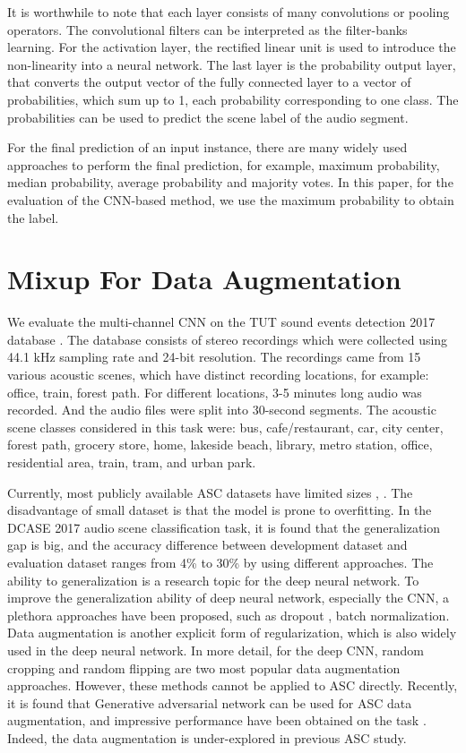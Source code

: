 \documentclass[conference]{IEEEtran}
\begin{document}
It is worthwhile to note that each layer consists of many convolutions or pooling operators. The convolutional filters can be interpreted as the filter-banks learning. For the activation layer, the rectified linear unit is used to introduce the non-linearity into a neural network. The last layer is the probability output layer, that converts the output vector of the fully connected layer to a vector of probabilities, which sum up to 1, each probability corresponding to one class. The probabilities can be used to predict the scene label of the audio segment.

For the final prediction of an input instance, there are many widely used approaches to perform the final prediction, for example, maximum probability, median probability, average probability and majority votes. In this paper, for the evaluation of the CNN-based method, we use the maximum probability to obtain the label.
 
\section{Mixup For Data Augmentation}

We evaluate the multi-channel CNN on the TUT sound events detection 2017 database \cite{b7}. The database consists of stereo recordings which were collected using 44.1 kHz sampling rate and 24-bit resolution. The recordings came from 15 various acoustic scenes, which have distinct recording locations, for example: office, train, forest path. For different locations, 3-5 minutes long audio was recorded. And the audio files were split into 30-second segments. The acoustic scene classes considered in this task were: bus, cafe/restaurant, car, city center, forest path, grocery store, home, lakeside beach, library, metro station, office, residential area, train, tram, and urban park.

Currently, most publicly available ASC datasets have limited sizes \cite{b3}, \cite{b7}. The disadvantage of small dataset is that the model is prone to overfitting. In the DCASE 2017 audio scene classification task, it is found that the generalization gap is big, and the accuracy difference between development dataset and evaluation dataset ranges from 4\% to 30\% by using different approaches. The ability to generalization is a research topic for the deep neural network. To improve the generalization ability of deep neural network, especially the CNN, a plethora approaches have been proposed, such as dropout \cite{b26}, batch normalization\cite{b27}. Data augmentation is another explicit form of regularization, which is also widely used in the deep neural network. In more detail, for the deep CNN, random cropping and random flipping are two most popular data augmentation approaches. However, these methods cannot be applied to ASC directly. Recently, it is found that Generative adversarial network can be used for ASC data augmentation, and impressive performance have been obtained on the task \cite{b28}. Indeed, the data augmentation is under-explored in previous ASC study.
\end{document}
